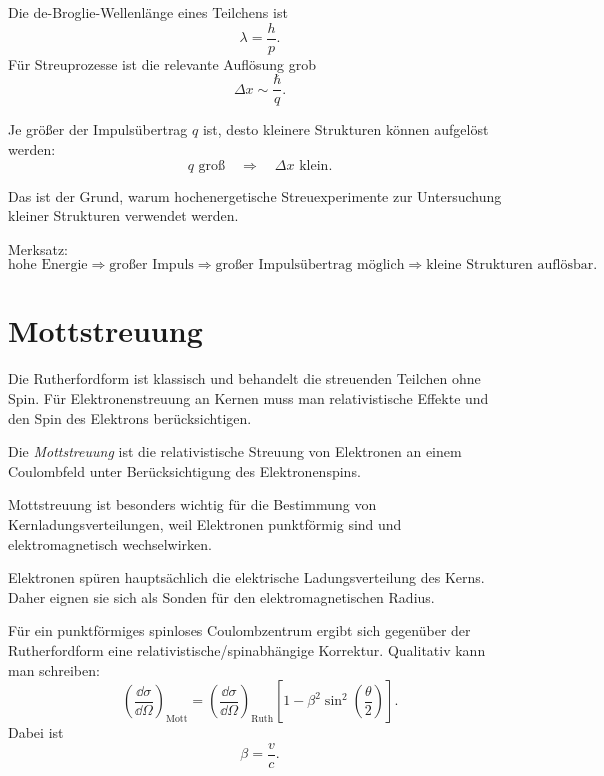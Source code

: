 \begin{formulabox}
Die de-Broglie-Wellenlänge eines Teilchens ist
\[
    \lambda = \frac{h}{p}.
\]
Für Streuprozesse ist die relevante Auflösung grob
\[
    \Delta x \sim \frac{\hbar}{q}.
\]
\end{formulabox}

\begin{conceptbox}
Je größer der Impulsübertrag $q$ ist, desto kleinere Strukturen können aufgelöst werden:
\[
    q \text{ groß}
    \quad\Rightarrow\quad
    \Delta x \text{ klein}.
\]

Das ist der Grund, warum hochenergetische Streuexperimente zur Untersuchung kleiner
Strukturen verwendet werden.
\end{conceptbox}

\begin{examtipbox}
Merksatz:
\[
    \text{hohe Energie}
    \Rightarrow
    \text{großer Impuls}
    \Rightarrow
    \text{großer Impulsübertrag möglich}
    \Rightarrow
    \text{kleine Strukturen auflösbar}.
\]
\end{examtipbox}

\section{Mottstreuung}

Die Rutherfordform ist klassisch und behandelt die streuenden Teilchen ohne Spin.
Für Elektronenstreuung an Kernen muss man relativistische Effekte und den Spin des
Elektrons berücksichtigen.

\begin{definitionbox}
Die \emph{Mottstreuung} ist die relativistische Streuung von Elektronen an einem
Coulombfeld unter Berücksichtigung des Elektronenspins.
\end{definitionbox}

\begin{conceptbox}
Mottstreuung ist besonders wichtig für die Bestimmung von Kernladungsverteilungen,
weil Elektronen punktförmig sind und elektromagnetisch wechselwirken.

Elektronen spüren hauptsächlich die elektrische Ladungsverteilung des Kerns.
Daher eignen sie sich als Sonden für den elektromagnetischen Radius.
\end{conceptbox}

\begin{formulabox}
Für ein punktförmiges spinloses Coulombzentrum ergibt sich gegenüber der Rutherfordform
eine relativistische/spinabhängige Korrektur.
Qualitativ kann man schreiben:
\[
    \left(\frac{\dd\sigma}{\dd\Omega}\right)_{\mathrm{Mott}}
    =
    \left(\frac{\dd\sigma}{\dd\Omega}\right)_{\mathrm{Ruth}}
    \left[
        1-\beta^2\sin^2\left(\frac{\theta}{2}\right)
    \right].
\]
Dabei ist
\[
    \beta=\frac{v}{c}.
\]
\end{formulabox}

